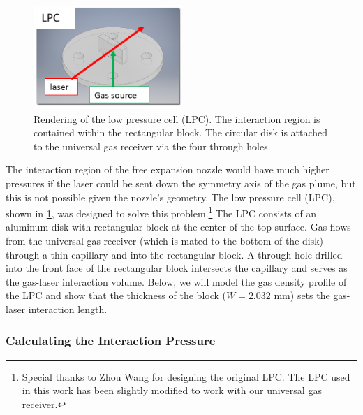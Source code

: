 \begin{figure}
	\centering
	\includegraphics[width=0.5\textwidth]{figures/chap3/LPC_diagram.png}
	\caption{Rendering of the low pressure cell (LPC). The interaction region is contained within the rectangular block. The circular disk is attached to the universal gas receiver via the four through holes.}
	\label{fig:LPC_diagram}
\end{figure}

The interaction region of the free expansion nozzle would have much higher pressures if the laser could be sent down the symmetry axis of the gas plume, but this is not possible given the nozzle's geometry. The low pressure cell (LPC), shown in \cref{fig:LPC_diagram}, was designed to solve this problem.\footnote{Special thanks to Zhou Wang \cite{wangMidinfraredStrongfieldLaser2018} for designing the original LPC. The LPC used in this work has been slightly modified to work with our universal gas receiver.} The LPC consists of an aluminum disk with rectangular block at the center of the top surface. Gas flows from the universal gas receiver (which is mated to the bottom of the disk) through a thin capillary and into the rectangular block. A through hole drilled into the front face of the rectangular block intersects the capillary and serves as the gas-laser interaction volume. Below, we will model the gas density profile of the LPC and show that the thickness of the block ($W = 2.032$ mm) sets the gas-laser interaction length.

\subsubsection{Calculating the Interaction Pressure}

